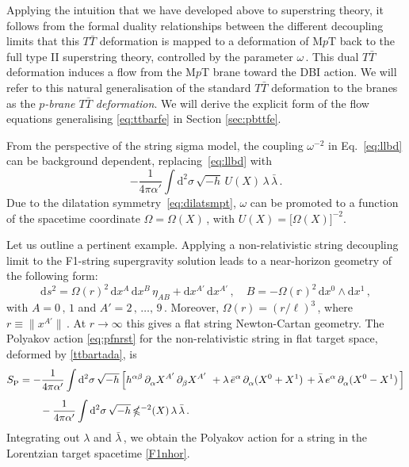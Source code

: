 \documentclass[11pt]{article}
\newcommand{\be}{\begin{equation}}
\newcommand{\ee}{\end{equation}}
\newcommand{\p}{\partial}
\renewcommand{\emph}[1]{\textit{#1}}
\newcommand{\dd}{\mathrm{d}}
\begin{document}
Applying the intuition that we have developed above to superstring theory, it follows from the formal duality relationships between the different decoupling limits that  this $T\bar{T}$ deformation is mapped to a deformation of M$p$T back to the full type II superstring theory, controlled by the parameter $\omega$\,. 
This dual $T\bar{T}$ deformation induces a flow from the M$p$T brane toward the DBI action. We will refer to this natural generalisation of the standard $T\bar{T}$ deformation to the branes as the \emph{$p$-brane $T\bar{T}$ deformation}. We will derive the explicit form of the flow equations generalising \eqref{eq:ttbarfe} in Section \ref{sec:pbttfe}.

From the perspective of the string sigma model, the coupling $\omega^{-2}$ in Eq.~\eqref{eq:llbd} can be background dependent, replacing~\eqref{eq:llbd} with
%
\be
    - \frac{1}{4\pi\alpha'} \int \dd^2 \sigma \, \sqrt{-h} \, U(X) \, \lambda \, \bar{\lambda}\,. 
    \label{ttbartada}
\ee
%
Due to the dilatation symmetry~\eqref{eq:dilatsmpt}, $\omega$ can be
promoted to a function of the spacetime coordinate $\mathbb{\Omega} = \mathbb{\Omega}(X)$\,, with $U(X) = \bigl[ \mathbb{\Omega} (X) \bigr]^{-2}$. 

Let us outline a pertinent example.
Applying a non-relativistic string decoupling limit to the F1-string supergravity solution leads to a near-horizon geometry of the following form: \cite{Danielsson:2000mu, Avila:2023aey, soliton}
%
\be
    \dd s^2 = \mathbb{\Omega}(r)^2 \, \dd x^A \, \dd x^B \, \eta^{}_{AB} + \dd x^{A'} \, \dd x^{A'} \,,
        \quad%
    B = -\mathbb{\Omega(r)}^2 \, \dd x^0 \wedge \dd x^1 \,,
\label{F1nhor}
\ee
%
with $A=0\,,\,1$ and $A'=2\,,\,\dots,\,9$\,. Moreover, $\mathbb{\Omega}(r) = (r/\ell)^3$\,, where $r\equiv \|x^{A'}\|$\,. At $r \rightarrow \infty$ this gives a flat string Newton-Cartan geometry.
The Polyakov action \eqref{eq:pfnrst} for the non-relativistic string in flat target space, deformed by 
\eqref{ttbartada}, is
\begin{align} \label{eq:pfnrst_example}
    S^{}_\text{P} & = - \frac{1}{4\pi\alpha'} \int \dd^2\sigma \, \sqrt{-h} \, \Bigl[ h^{\alpha\beta} \, \p^{}_\alpha X^{A'} \, \p^{}_\beta X^{A'} \ + \lambda \, \bar{e}^\alpha \, \p^{}_\alpha (X^0+X^1)\,  + \bar{\lambda} \, e^\alpha \, \p^{}_\alpha (X^0-X^1) \,\Bigr] \notag \\[4pt]
    & \qquad - \frac{1}{4\pi\alpha'} \int \dd^2 \sigma \, \sqrt{-h} \, \mathbb{\Omega}^{-2}(X) \, \lambda \, \bar{\lambda}\,. 
\end{align}
Integrating out $\lambda$ and $\bar \lambda$\,,
we obtain the Polyakov action for a string in the Lorentzian target spacetime \eqref{F1nhor}.
\end{document}
